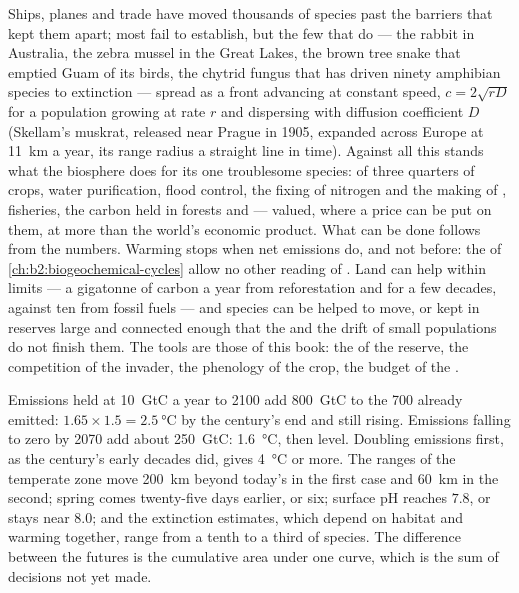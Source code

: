 \begin{proposition}\label{prop:b2:global-change:invasion}
Ships, planes and trade have moved thousands of species past the
barriers that kept them apart; most fail to establish, but the
few that do --- the rabbit in Australia, the zebra mussel in the
Great Lakes, the brown tree snake that emptied Guam of its birds,
the chytrid fungus that has driven ninety amphibian species to
extinction --- spread as a front advancing at constant speed, $c =
2\sqrt{rD}$ for a population growing at rate $r$ and dispersing
with diffusion coefficient $D$ (Skellam's muskrat, released near
Prague in 1905, expanded across Europe at \qty{11}{km} a year,
its range radius a straight line in time). Against all this stands
what the biosphere does for its one troublesome species:
 of three quarters of crops, water purification, flood
control, the fixing of nitrogen and the making of , fisheries,
the carbon held in forests and  --- \emph{}
valued, where a price can be put on them, at more than the world's
economic product. What can be done follows from the numbers.
Warming stops when net emissions do, and not before: the  of \cref{ch:b2:biogeochemical-cycles} allow no other
reading of \emph{}. Land can help within limits --- a
gigatonne of carbon a year from reforestation and  for a few
decades, against ten from fossil fuels --- and species can be
helped to move, or kept in reserves large and connected enough
that the  and the drift of small populations
do not finish them. The tools are those of this book: the
 of the reserve, the competition of the
invader, the phenology of the crop, the budget of the .
\end{proposition}

\begin{example}\label{ex:b2:global-change:scenarios}
Emissions held at \qty{10}{GtC} a year to 2100 add \qty{800}{GtC}
to the \qty{700}{} already emitted: $1.65\times 1.5 =
\qty{2.5}{\celsius}$ by the century's end and still rising. Emissions
falling to zero by 2070 add about \qty{250}{GtC}: \qty{1.6}{\celsius},
then level. Doubling emissions first, as the century's early
decades did, gives \qty{4}{\celsius} or more. The ranges of the
temperate zone move \qty{200}{km} beyond today's in the first case
and \qty{60}{km} in the second; spring comes twenty-five
days earlier, or six; surface pH reaches $7.8$, or stays near
$8.0$; and the extinction estimates, which depend on habitat and
warming together, range from a tenth to a third of species. The
difference between the futures is the cumulative area under one
curve, which is the sum of decisions not yet made.
\end{example}

